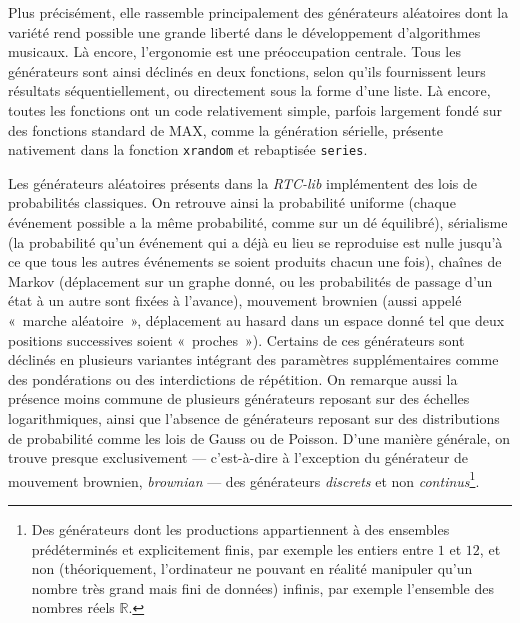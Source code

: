 \documentclass[a4paper,12pt]{article}
\newcommand{\guill}[1]{«~#1~»}
\begin{document}
Plus précisément, elle rassemble principalement des générateurs aléatoires dont la variété rend possible une grande liberté dans le développement d'algorithmes musicaux. Là encore, l'ergonomie est une préoccupation centrale. Tous les générateurs sont ainsi déclinés en deux fonctions, selon qu'ils fournissent leurs résultats séquentiellement, ou directement sous la forme d'une liste. Là encore, toutes les fonctions ont un code relativement simple, parfois largement fondé sur des fonctions standard de MAX, comme la génération sérielle, présente nativement dans la fonction \texttt{xrandom} et rebaptisée \texttt{series}.

Les générateurs aléatoires présents dans la \emph{RTC-lib} implémentent des lois de probabilités classiques. On retrouve ainsi la probabilité uniforme (chaque événement possible a la même probabilité, comme sur un dé équilibré), sérialisme (la probabilité qu'un événement qui a déjà eu lieu se reproduise est nulle jusqu'à ce que tous les autres événements se soient produits chacun une fois), chaînes de Markov (déplacement sur un graphe donné, ou les probabilités de passage d'un état à un autre sont fixées à l'avance), mouvement brownien (aussi appelé \guill{marche aléatoire}, déplacement au hasard dans un espace donné tel que deux positions successives soient \guill{proches}). Certains de ces générateurs sont déclinés en plusieurs variantes intégrant des paramètres supplémentaires comme des pondérations ou des interdictions de répétition. On remarque aussi la présence moins commune de plusieurs générateurs reposant sur des échelles logarithmiques, ainsi que l'absence de générateurs reposant sur des distributions de probabilité comme les lois de Gauss ou de Poisson. D'une manière générale, on trouve presque exclusivement --- c'est-à-dire à l'exception du générateur de mouvement brownien, \emph{brownian} --- des générateurs \emph{discrets} et non \emph{continus}\footnote{Des générateurs dont les productions appartiennent à des ensembles prédéterminés et explicitement finis, par exemple les entiers entre $1$ et $12$, et non (théoriquement, l'ordinateur ne pouvant en réalité manipuler qu'un nombre très grand mais fini de données) infinis, par exemple l'ensemble des nombres réels $\mathbb{R}$.}.
\end{document}
